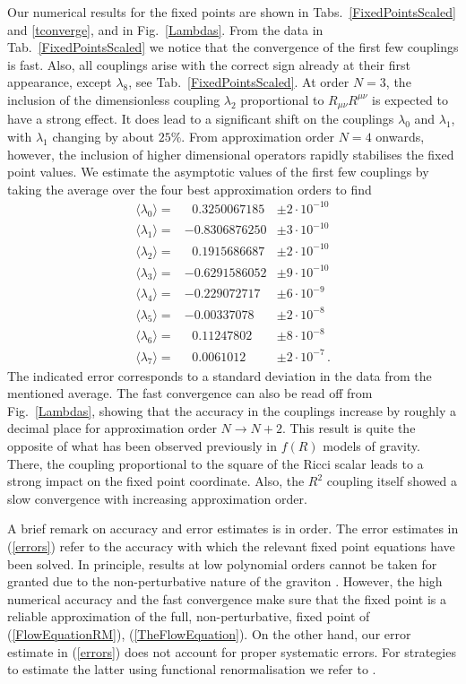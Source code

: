 \documentclass[notitlepage,eqsecnum,bm,amsmath,preprintnumbers,superscriptaddress,nofootinbib,aps,11pt]{revtex4-1}
\def\eq#1{(\ref{#1})}
\begin{document}
Our numerical results for the fixed points are shown in Tabs.~\ref{FixedPointsScaled} and \ref{tconverge}, and in Fig.~\ref{Lambdas}. 
From the data in Tab.~\ref{FixedPointsScaled} we notice that the convergence of the first few couplings is fast. Also, all couplings arise with the correct sign already at their first appearance, except $\lambda_8$, see Tab.~\ref{FixedPointsScaled}.   At order $N=3$, 
the inclusion of the dimensionless coupling $\lambda_2$ proportional to $R_{\mu\nu}R^{\mu\nu}$ is expected to have a strong effect. 
It does lead to a significant shift on the couplings $\lambda_0$ and $\lambda_1$, with $\lambda_1$ changing by about $25\%$. From approximation order $N=4$ onwards, however, the inclusion of higher dimensional operators rapidly stabilises the fixed point values. 
We estimate the asymptotic values of the first few couplings by taking the average over the four best approximation orders to find
\begin{equation}\label{errors}
\begin{array}{rll}
\langle\lambda_0\rangle=&\ \ \,0.3250067185&\pm 2 \cdot 10^{-10}\\
\langle\lambda_1\rangle=&-0.8306876250&\pm 3\cdot 10^{-10}\\
\langle\lambda_2\rangle=&\ \ \, 0.1915686687&\pm 2\cdot 10^{-10}\\
\langle\lambda_3\rangle=&-0.6291586052&\pm 9\cdot 10^{-10}\\
\langle\lambda_4\rangle=&-0.229072717&\pm 6\cdot 10^{-9}\\
\langle\lambda_5\rangle=&-0.00337078&\pm 2\cdot 10^{-8}\\
\langle\lambda_6\rangle=&\ \ \,0.11247802&\pm 8\cdot 10^{-8}\\
\langle\lambda_7\rangle=&\ \ \,0.0061012&\pm  2\cdot 10^{-7}\,.
\end{array}
\end{equation}
The indicated error corresponds to a standard deviation in the data from the mentioned average. The fast convergence can also be read off from Fig.~\ref{Lambdas}, showing that the accuracy in the couplings increase by roughly a decimal place for approximation order $N\to N+2$. 
 This result is quite the opposite of what has been observed previously in $f(R)$ models of gravity. There, the coupling proportional 
to the square of the Ricci scalar leads to a strong impact on the fixed point coordinate. Also, the $R^2$ coupling itself showed 
a slow convergence with increasing approximation order. 

A brief remark on accuracy and error estimates is in order. The error estimates in \eq{errors} refer to the accuracy with which the relevant fixed point equations have been solved. In principle, results at low polynomial orders cannot be taken for granted due to the non-perturbative nature of the graviton \cite{Falls:2013bv}. However, the high numerical accuracy and the fast convergence make sure that the fixed point is a reliable approximation of the full, non-perturbative, fixed point of \eq{FlowEquationRM}, \eq{TheFlowEquation}. On the other hand, our error estimate in \eq{errors} does not account for proper systematic errors. For strategies to estimate the latter using functional renormalisation we refer to \cite{Litim:2010tt}.
\end{document}
